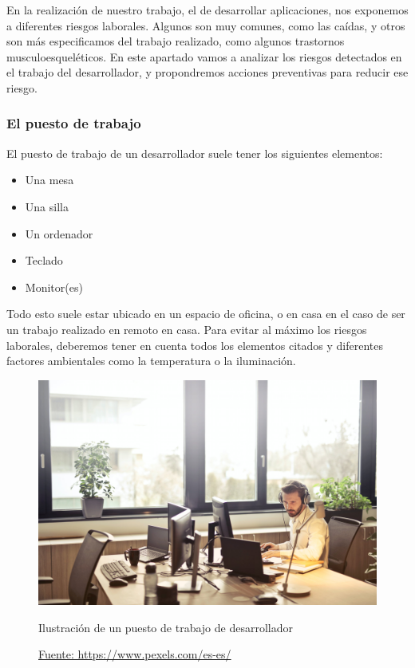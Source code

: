 
En la realización de nuestro trabajo, el de desarrollar aplicaciones, nos exponemos a
diferentes riesgos laborales. Algunos son muy comunes, como las caídas, y otros son más especificamos
del trabajo realizado, como algunos trastornos musculoesqueléticos. En este apartado vamos a analizar
los riesgos detectados en el trabajo del desarrollador, y propondremos acciones preventivas para
reducir ese riesgo.\\

\subsubsection{El puesto de trabajo}
El puesto de trabajo de un desarrollador suele tener los siguientes elementos:
\begin{itemize}
    \item Una mesa
    \item Una silla
    \item Un ordenador
    \item Teclado
    \item Monitor(es)
\end{itemize}
Todo esto suele estar ubicado en un espacio de oficina, o en casa en el caso de ser un
trabajo realizado en remoto en casa. Para evitar al máximo los riesgos laborales, deberemos 
tener en cuenta todos los elementos citados y diferentes factores ambientales como la temperatura o la iluminación.

\begin{figure}[H]
    \centering
    \includegraphics[width=1.0\textwidth]{Fol/oficina.jpeg}
    \caption{Ilustración de un puesto de trabajo de desarrollador}
    \caption*{\href{https://www.pexels.com/es-es/foto/hombre-con-auriculares-frente-al-monitor-de-la-computadora-845451/}{Fuente: https://www.pexels.com/es-es/}}
\end{figure}

